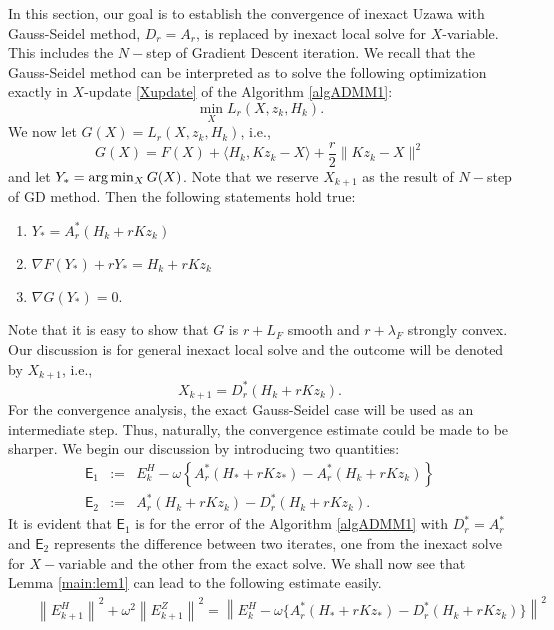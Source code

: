\begin{itemize}
In this section, our goal is to establish the convergence of inexact Uzawa with Gauss-Seidel method, $D_r = A_r$, is replaced by inexact local solve for $X$-variable. This includes the $N-$step of Gradient Descent iteration. We recall that the Gauss-Seidel method can be interpreted as to solve the following optimization exactly in $X$-update \eqref{Xupdate} of the Algorithm \ref{algADMM1}:  
\begin{equation}
\min_{X} L_r(X,z_k,H_k).  
\end{equation}
We now let $G(X) = L_r(X,z_k,H_k)$, i.e.,  
\begin{equation}
G(X) = F(X) + \langle H_k, Kz_k - X\rangle + \frac{r}{2}\|Kz_k - X\|^2 
\end{equation}
and let $Y_*  = {\rm arg}\min_X G(X)$. Note that we reserve $X_{k+1}$ as the result of $N-$step of GD method. Then the following statements hold true: 
\begin{enumerate} 
\item $Y_* = A_r^*(H_k + rKz_k)$ 
\item $\nabla F(Y_*) + r Y_* = H_k + rKz_k$ 
\item $\nabla G(Y_*) = 0$. 
\end{enumerate} 
Note that it is easy to show that $G$ is $r+L_F$ smooth and $r+\lambda_F$ strongly convex. Our discussion is for general inexact local solve and the outcome will be denoted by $X_{k+1}$, i.e., 
\begin{equation}
X_{k+1} = D_r^*(H_k + rKz_k). 
\end{equation}
For the convergence analysis, the exact Gauss-Seidel case will be used as an intermediate step. Thus, naturally, the convergence estimate could be made to be sharper. We begin our discussion by introducing two quantities:
\begin{eqnarray*}
\textsf{E}_1 &:=& E_k^H - \omega \left \{A_r^{*}(H_* + rKz_*) - A_r^*(H_k + rKz_k) \right \}\\
\textsf{E}_2 &:=& A_r^*(H_k + rKz_k) - D_r^*(H_k + rKz_k).  
\end{eqnarray*}
It is evident that $\textsf{E}_1$ is for the error of the Algorithm \ref{algADMM1} with $D_r^* = A_r^*$ and $\textsf{E}_2$ represents the difference between two iterates, one from the inexact solve for $X-$variable and the other from the exact solve. We shall now see that Lemma \ref{main:lem1} can lead to the following estimate easily. 
\begin{eqnarray*}
&& \left \|E_{k+1}^H \right \|^2 + \omega^2 \left \|E_{k+1}^Z \right \|^2 = \left \|E_k^H - \omega \{ A_r^{*} (H_* + r K z_*) - D_r^{*} (H_k + r K z_k) \} \right \|^2 \\

\end{eqnarray*}
\end{itemize}
